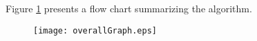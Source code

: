 Figure \ref{fig:overview} presents a flow chart  summarizing the
algorithm. 

\begin{figure}[htbp]
  \begin{center}
\texttt{[image: overallGraph.eps]}
    \label{fig:overview}
  \end{center}
\end{figure}







  

